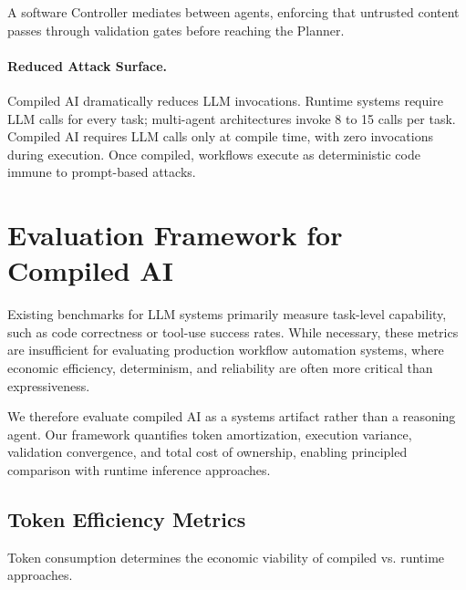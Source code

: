 \documentclass[11pt]{article}
\begin{document}
A software Controller mediates between agents, enforcing that untrusted content passes through validation gates before reaching the Planner.

\paragraph{Reduced Attack Surface.} Compiled AI dramatically reduces LLM invocations. Runtime systems require LLM calls for every task; multi-agent architectures invoke 8 to 15 calls per task. Compiled AI requires LLM calls only at compile time, with zero invocations during execution. Once compiled, workflows execute as deterministic code immune to prompt-based attacks.

\section{Evaluation Framework for Compiled AI}
\label{sec:framework}

Existing benchmarks for LLM systems primarily measure task-level capability, such as code correctness or tool-use success rates. While necessary, these metrics are insufficient for evaluating production workflow automation systems, where economic efficiency, determinism, and reliability are often more critical than expressiveness.

We therefore evaluate compiled AI as a systems artifact rather than a reasoning agent. Our framework quantifies token amortization, execution variance, validation convergence, and total cost of ownership, enabling principled comparison with runtime inference approaches.

\subsection{Token Efficiency Metrics}

Token consumption determines the economic viability of compiled vs. runtime approaches.
\end{document}
